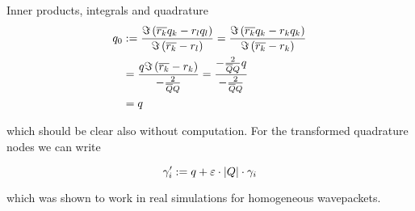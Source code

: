 \begin{chapter}{Inner products, integrals and quadrature}
\begin{equation}
\begin{split}
  q_0 & := \frac{\Im \left(\overline{r_k}q_k-r_l q_l\right)}{\Im \left(\overline{r_k}-r_l\right)}
        = \frac{\Im \left(\overline{r_k}q_k-r_k q_k\right)}{\Im \left(\overline{r_k}-r_k\right)} \\
      & = \frac{q \Im \left(\overline{r_k}-r_k\right)}{-\frac{2}{\overline{Q}Q}}
        = \frac{-\frac{2}{\overline{Q}Q}q}{-\frac{2}{\overline{Q}Q}} \\
      & = q
\end{split}
\end{equation}

which should be clear also without computation. For the transformed quadrature
nodes we can write 

\begin{equation}
  \gamma^{\prime}_i := q + \varepsilon \cdot |Q| \cdot \gamma_i
\end{equation}

which was shown to work in real simulations for homogeneous wavepackets.



\end{chapter}
